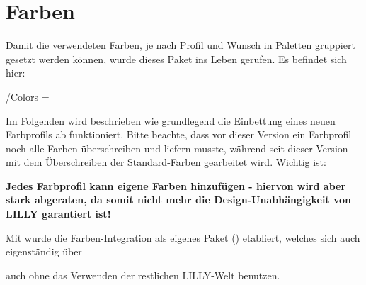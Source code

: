 \chapter[Farben \LILLYxBOXxVersion{\small 1.0.4}]{Farben}
\bigskip\newline
{}Damit die verwendeten Farben, je nach Profil und Wunsch in Paletten gruppiert gesetzt werden können, wurde dieses Paket ins Leben gerufen. Es befindet sich hier:\begin{center}
    /Colors = 
\end{center}
Im Folgenden wird beschrieben wie grundlegend die Einbettung eines neuen Farbprofils ab  funktioniert. Bitte beachte, dass vor dieser Version ein Farbprofil noch alle Farben überschreiben und liefern musste, während seit dieser Version mit dem Überschreiben der Standard-Farben gearbeitet wird. Wichtig ist:\begin{center}
    \small\bfseries Jedes Farbprofil kann eigene Farben hinzufügen - hiervon wird aber stark abgeraten, da somit nicht mehr die Design-Unabhängigkeit von LILLY garantiert ist!
\end{center}
\begin{bemerkung}
    Mit  wurde die Farben-Integration als eigenes Paket () etabliert, welches sich auch eigenständig über \begin{latex}
\usepackage{LILLYxCOLOR}
        \end{latex}
        auch ohne das Verwenden der restlichen LILLY-Welt benutzen.
\end{bemerkung}

